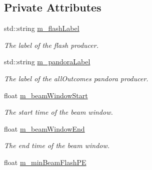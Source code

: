 \subsection*{Private Attributes}
\begin{DoxyCompactItemize}
\item 
\hypertarget{classflashmatch_1_1FlashMatchingTool_a1d8717c68408b4b6bcada1d833f52b85}{std\-::string \hyperlink{classflashmatch_1_1FlashMatchingTool_a1d8717c68408b4b6bcada1d833f52b85}{m\-\_\-flash\-Label}}\label{classflashmatch_1_1FlashMatchingTool_a1d8717c68408b4b6bcada1d833f52b85}

\begin{DoxyCompactList}\small\item\em The label of the flash producer. \end{DoxyCompactList}\item 
\hypertarget{classflashmatch_1_1FlashMatchingTool_a268e4c99f49178112c76b0fd4f5dc83e}{std\-::string \hyperlink{classflashmatch_1_1FlashMatchingTool_a268e4c99f49178112c76b0fd4f5dc83e}{m\-\_\-pandora\-Label}}\label{classflashmatch_1_1FlashMatchingTool_a268e4c99f49178112c76b0fd4f5dc83e}

\begin{DoxyCompactList}\small\item\em The label of the all\-Outcomes pandora producer. \end{DoxyCompactList}\item 
\hypertarget{classflashmatch_1_1FlashMatchingTool_a33272b2692b9eee1ee1f5af82696e558}{float \hyperlink{classflashmatch_1_1FlashMatchingTool_a33272b2692b9eee1ee1f5af82696e558}{m\-\_\-beam\-Window\-Start}}\label{classflashmatch_1_1FlashMatchingTool_a33272b2692b9eee1ee1f5af82696e558}

\begin{DoxyCompactList}\small\item\em The start time of the beam window. \end{DoxyCompactList}\item 
\hypertarget{classflashmatch_1_1FlashMatchingTool_a8a7cc0d75c962df7d5bf20cc1edccde2}{float \hyperlink{classflashmatch_1_1FlashMatchingTool_a8a7cc0d75c962df7d5bf20cc1edccde2}{m\-\_\-beam\-Window\-End}}\label{classflashmatch_1_1FlashMatchingTool_a8a7cc0d75c962df7d5bf20cc1edccde2}

\begin{DoxyCompactList}\small\item\em The end time of the beam window. \end{DoxyCompactList}\item 
\hypertarget{classflashmatch_1_1FlashMatchingTool_ab6bfd0f0b1d32f1d647d978963ffcfea}{float \hyperlink{classflashmatch_1_1FlashMatchingTool_ab6bfd0f0b1d32f1d647d978963ffcfea}{m\-\_\-min\-Beam\-Flash\-P\-E}}\label{classflashmatch_1_1FlashMatchingTool_ab6bfd0f0b1d32f1d647d978963ffcfea}


\end{DoxyCompactItemize}
